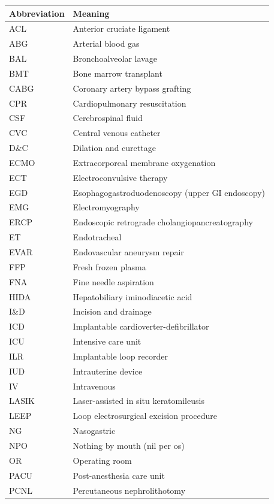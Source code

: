 \documentclass[12pt,oneside]{book}
\begin{document}
\begin{footnotesize}
\begin{longtable}{@{}ll@{}}
\toprule
\textbf{Abbreviation} & \textbf{Meaning} \\
\midrule
\endhead
ACL & Anterior cruciate ligament \\
ABG & Arterial blood gas \\
BAL & Bronchoalveolar lavage \\
BMT & Bone marrow transplant \\
CABG & Coronary artery bypass grafting \\
CPR & Cardiopulmonary resuscitation \\
CSF & Cerebrospinal fluid \\
CVC & Central venous catheter \\
D\&C & Dilation and curettage \\
ECMO & Extracorporeal membrane oxygenation \\
ECT & Electroconvulsive therapy \\
EGD & Esophagogastroduodenoscopy (upper GI endoscopy) \\
EMG & Electromyography \\
ERCP & Endoscopic retrograde cholangiopancreatography \\
ET & Endotracheal \\
EVAR & Endovascular aneurysm repair \\
FFP & Fresh frozen plasma \\
FNA & Fine needle aspiration \\
HIDA & Hepatobiliary iminodiacetic acid \\
I\&D & Incision and drainage \\
ICD & Implantable cardioverter-defibrillator \\
ICU & Intensive care unit \\
ILR & Implantable loop recorder \\
IUD & Intrauterine device \\
IV & Intravenous \\
LASIK & Laser-assisted in situ keratomileusis \\
LEEP & Loop electrosurgical excision procedure \\
NG & Nasogastric \\
NPO & Nothing by mouth (nil per os) \\
OR & Operating room \\
PACU & Post-anesthesia care unit \\
PCNL & Percutaneous nephrolithotomy \\

\end{longtable}
\end{footnotesize}
\end{document}
